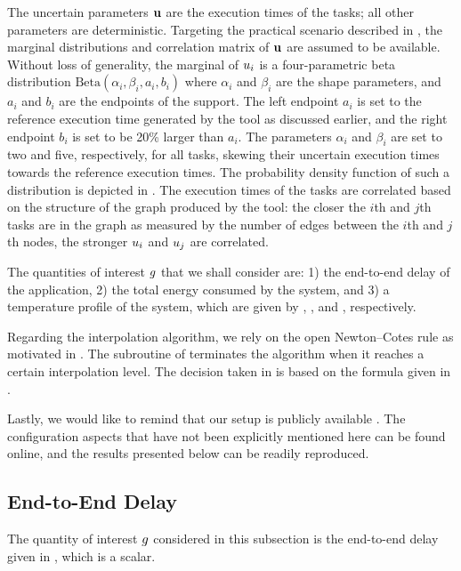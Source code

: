
The uncertain parameters $\mathbf{u}$ are the execution times of the tasks; all other
parameters are deterministic. Targeting the practical scenario described in
, the marginal distributions and correlation matrix
of $\mathbf{u}$ are assumed to be available. Without loss of generality, the marginal
of $u_i$ is a four-parametric beta distribution $\text{Beta}(\alpha_i, \beta_i,
a_i, b_i)$ where $\alpha_i$ and $\beta_i$ are the shape parameters, and $a_i$
and $b_i$ are the endpoints of the support. The left endpoint $a_i$ is set to
the reference execution time generated by the  tool as discussed
earlier, and the right endpoint $b_i$ is set to be 20\% larger than $a_i$. The
parameters $\alpha_i$ and $\beta_i$ are set to two and five, respectively, for
all tasks, skewing their uncertain execution times towards the reference
execution times. The probability density function of such a distribution is
depicted in . The execution times of the tasks are correlated based
on the structure of the graph produced by the  tool: the closer the
$i$th and $j$th tasks are in the graph as measured by the number of edges
between the $i$th and $j$th nodes, the stronger $u_i$ and $u_j$ are
correlated.

The quantities of interest $g$ that we shall consider are: 1) the end-to-end
delay of the application, 2) the total energy consumed by the system, and 3) a
temperature profile of the system, which are given by ,
, and , respectively.

Regarding the interpolation algorithm, we rely on the open Newton--Cotes rule as
motivated in . The  subroutine of
 terminates the algorithm when it reaches a certain
interpolation level. The decision taken in  is based on the
formula given in .

Lastly, we would like to remind that our setup is publicly available
\cite{sources}. The configuration aspects that have not been explicitly
mentioned here can be found online, and the results presented below can be
readily reproduced.

\subsection{End-to-End Delay}

The quantity of interest $g$ considered in this subsection is the end-to-end
delay given in , which is a scalar.

